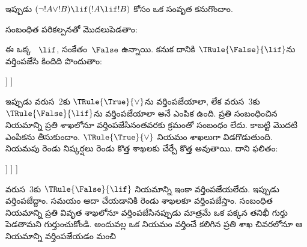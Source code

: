 \documentclass[../../../include/open-logic-section]{subfiles}
\begin{document}
\begin{ex}
ఇప్పుడు $(\lnot !A \lor !B) \lif (!A \lif !B)$ కోసం ఒక సంవృత
 కనుగొందాం.

సంబంధిత పరికల్పనతో మొదలుపెడతాం:
\begin{oltableau}
  [\sFmla{\False}{(\lnot \formula{A} \lor \formula{B}) \lif
      (\formula{A} \lif \formula{B})}, just=\TAss]
\end{oltableau}
ఈ  ఒక్క  ~$\lif$,
సంకేతం~$\False$ ఉన్నాయి. కనుక దానికి $\TRule{\False}{\lif}$ను
వర్తింపజేసి కిందిది పొందుతాం:
\begin{oltableau}
  [\sFmla{\False}{(\lnot \formula{A} \lor \formula{B})
      \lif (\formula{A} \lif \formula{B})}, just=\TAss, checked
    [\sFmla{\True}{\lnot \formula{A} \lor \formula{B}},
      just={\TRule{\False}{\lif}[1]}
      [\sFmla{\False}{(\formula{A} \lif \formula{B})},
        just={\TRule{\False}{\lif}[1]}
      ]
    ]
  ]
\end{oltableau}
ఇప్పుడు వరుస~$2$కు $\TRule{\True}{\lor}$ను వర్తింపజేయాలా, లేక
వరుస~$3$కు $\TRule{\False}{\lif}$ను వర్తింపజేయాలా అనే ఎంపిక ఉంది.
ప్రతి  సంబంధించిన నియమాన్ని ప్రతి శాఖలోనూ
వర్తింపజేసినంతవరకు క్రమంతో సంబంధం లేదు. కాబట్టి మొదటి
ఎంపికను తీసుకుందాం. $\TRule{\True}{\lor}$ నియమం 
శాఖలుగా విడగొడుతుంది. నియమపు రెండు నిష్కర్షలు రెండు కొత్త శాఖలకు
చేర్చే కొత్త  అవుతాయి. దాని ఫలితం:
\begin{oltableau}
  [\sFmla{\False}{(\lnot \formula{A} \lor \formula{B}) \lif
      (\formula{A} \lif \formula{B})}, just=\TAss, checked
    [\sFmla{\True}{\lnot \formula{A} \lor \formula{B}},
      just={\TRule{\False}{\lif}[1]}, checked
      [\sFmla{\False}{(\formula{A} \lif \formula{B})},
        just={\TRule{\False}{\lif}[1]}
        [\sFmla{\True}{\lnot \formula{A}}, just={\TRule{\True}{\lor}[2]}]
        [\sFmla{\True}{\formula{B}}, just={\TRule{\True}{\lor}[2]}]
      ]
    ]
  ]
\end{oltableau}
వరుస~$3$కు $\TRule{\False}{\lif}$ నియమాన్ని ఇంకా వర్తింపజేయలేదు.
ఇప్పుడు వర్తింపజేద్దాం. సమయం ఆదా చేయడానికి రెండు శాఖలకూ
వర్తింపజేస్తాం. సంబంధిత నియమాన్ని ప్రతి వివృత శాఖలోనూ
వర్తింపజేసినప్పుడు మాత్రమే ఒక  పక్కన తనిఖీ గుర్తు
పెడతామని గుర్తుంచుకోండి. అందువల్ల ఒక నియమం వర్తించే
 కలిగిన ప్రతి శాఖ చివరలోనూ ఆ నియమాన్ని వర్తింపజేయడం మంచి

\end{ex}
\end{document}
